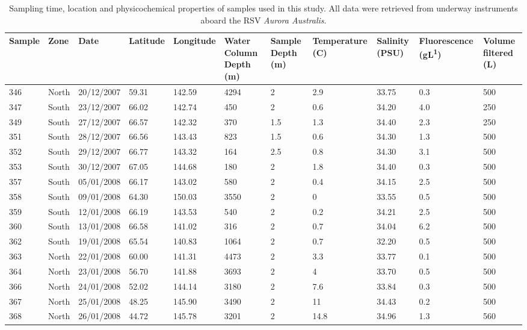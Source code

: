 \begin{landscape}
\begin{table}
\sffamily
\caption[Details of samples used in Polar Front study]{\sffamily{}Sampling time, location and physicochemical properties of samples used in this study.
All data were retrieved from underway instruments aboard the RSV \textit{Aurora Australis}.}
\label{tab:samplelist}
\begin{tabularx}{\linewidth}{llllXXXXXXX}
\toprule
\textbf{Sample} & \textbf{Zone} & \textbf{Date} & \textbf{Latitude} & \textbf{Longitude} & \textbf{Water \linebreak Column \linebreak Depth (m)} & \textbf{Sample Depth (m)} & \textbf{Temperature (\textdegree{}C)} & \textbf{Salinity (PSU)} & \textbf{Fluorescence \linebreak (\textmu{}gL\textsuperscript{\textminus{}1})} & \textbf{Volume \linebreak filtered (L)}\\
\midrule

346 & North & 20/12/2007 & \textminus{}59.31 & 142.59 & 4294 & 2 & 2.9 & 33.75 & 0.3 & 500\\
347 & South & 23/12/2007 & \textminus{}66.02 & 142.74 & 450 & 2 & 0.6 & 34.20 & 4.0 & 250\\
349 & South & 27/12/2007 & \textminus{}66.57 & 142.32 & 370 & 1.5 & \textminus{}1.3 & 34.40 & 2.3 & 250\\
351 & South & 28/12/2007 & \textminus{}66.56 & 143.43 & 823 & 1.5 & \textminus{}0.6 & 34.30 & 1.3 & 500\\
352 & South & 29/12/2007 & \textminus{}66.77 & 143.32 & 164 & 2.5 & \textminus{}0.8 & 34.30 & 3.1 & 500\\
353 & South & 30/12/2007 & \textminus{}67.05 & 144.68 & 180 & 2 & \textminus{}1.8 & 34.40 & 0.3 & 500\\
357 & South & 05/01/2008 & \textminus{}66.17 & 143.02 & 580 & 2 & \textminus{}0.4 & 34.15 & 2.5 & 500\\
358 & South & 09/01/2008 & \textminus{}64.30 & 150.03 & 3550 & 2 & 0 & 33.55 & 0.5 & 500\\
359 & South & 12/01/2008 & \textminus{}66.19 & 143.53 & 540 & 2 & \textminus{}0.2 & 34.21 & 2.5 & 500\\
360 & South & 13/01/2008 & \textminus{}66.58 & 141.02 & 316 & 2 & \textminus{}0.7 & 34.04 & 6.2 & 500\\
362 & South & 19/01/2008 & \textminus{}65.54 & 140.83 & 1064 & 2 & 0.7 & 32.20 & 0.5 & 500\\
363 & North & 22/01/2008 & \textminus{}60.00 & 141.31 & 4473 & 2 & 3.3 & 33.77 & 0.1 & 500\\
364 & North & 23/01/2008 & \textminus{}56.70 & 141.88 & 3693 & 2 & 4 & 33.70 & 0.5 & 500\\
366 & North & 24/01/2008 & \textminus{}52.02 & 144.14 & 3180 & 2 & 7.6 & 33.84 & 0.3 & 500\\
367 & North & 25/01/2008 & \textminus{}48.25 & 145.90 & 3490 & 2 & 11 & 34.43 & 0.2 & 500\\
368 & North & 26/01/2008 & \textminus{}44.72 & 145.78 & 3201 & 2 & 14.8 & 34.96 & 1.3 & 560\\


\end{tabularx}
\end{table}
\end{landscape}
